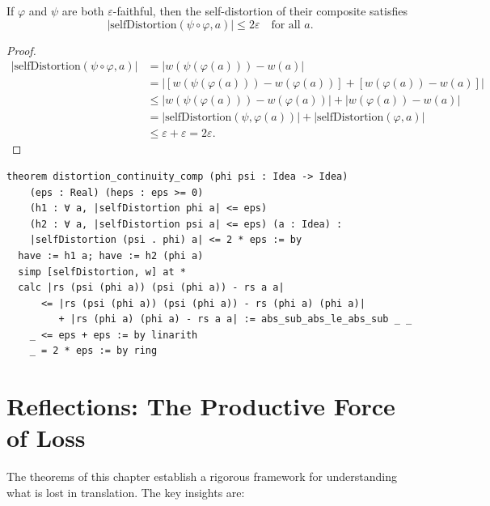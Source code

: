 \begin{theorem}
\label{thm:distortion-continuity}
If $\varphi$ and $\psi$ are both $\varepsilon$-faithful, then the
self-distortion of their composite satisfies
\[
  |\mathrm{selfDistortion}(\psi \circ \varphi, a)| \leq 2\varepsilon
  \quad \text{for all } a.
\]
\end{theorem}

\begin{proof}
\begin{align*}
  |\mathrm{selfDistortion}(\psi \circ \varphi, a)|
    &= |w(\psi(\varphi(a))) - w(a)| \\
    &= |[w(\psi(\varphi(a))) - w(\varphi(a))] + [w(\varphi(a)) - w(a)]| \\
    &\leq |w(\psi(\varphi(a))) - w(\varphi(a))| + |w(\varphi(a)) - w(a)| \\
    &= |\mathrm{selfDistortion}(\psi, \varphi(a))|
       + |\mathrm{selfDistortion}(\varphi, a)| \\
    &\leq \varepsilon + \varepsilon = 2\varepsilon.
\end{align*}
\end{proof}

\begin{lstlisting}
theorem distortion_continuity_comp (phi psi : Idea -> Idea)
    (eps : Real) (heps : eps >= 0)
    (h1 : ∀ a, |selfDistortion phi a| <= eps)
    (h2 : ∀ a, |selfDistortion psi a| <= eps) (a : Idea) :
    |selfDistortion (psi . phi) a| <= 2 * eps := by
  have := h1 a; have := h2 (phi a)
  simp [selfDistortion, w] at *
  calc |rs (psi (phi a)) (psi (phi a)) - rs a a|
      <= |rs (psi (phi a)) (psi (phi a)) - rs (phi a) (phi a)|
         + |rs (phi a) (phi a) - rs a a| := abs_sub_abs_le_abs_sub _ _
    _ <= eps + eps := by linarith
    _ = 2 * eps := by ring
\end{lstlisting}

\section{Reflections: The Productive Force of Loss}

The theorems of this chapter establish a rigorous framework for understanding
what is lost in translation.  The key insights are:

